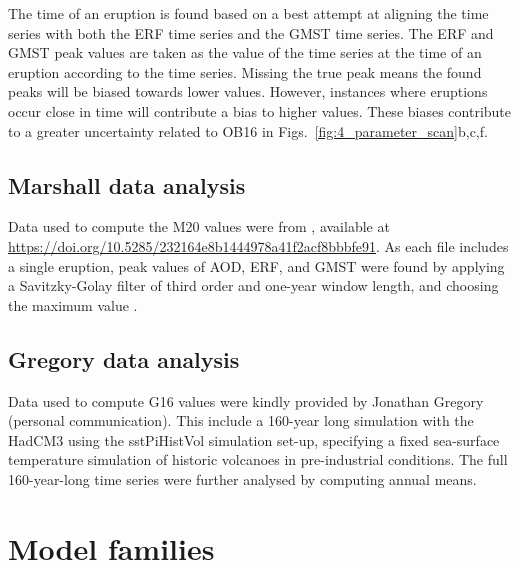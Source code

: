 \documentclass[draft]{agujournal2019}
\begin{document}
  The time of an eruption is found based on a best attempt at aligning the  time
  series with both the ERF time series and the GMST time series. The ERF and GMST peak
  values are taken as the value of the time series at the time of an eruption according
  to the  time series. Missing the true peak means the found peaks will be
  biased towards lower values. However, instances where eruptions occur close in time
  will contribute a bias to higher values. These biases contribute to a greater
  uncertainty related to OB16 in Figs.~\ref{fig:4_parameter_scan}b,c,f.

  \subsection{Marshall data analysis}

  \label{ap:m20}

  Data used to compute the M20 values were from , available
  at \url{https://doi.org/10.5285/232164e8b1444978a41f2acf8bbbfe91}. As each file
  includes a single eruption, peak values of AOD, ERF, and GMST were found by applying a
  Savitzky-Golay filter of third order and one-year window length, and choosing the
  maximum value \cite{savitzky1964}.

  \subsection{Gregory data analysis}

  \label{ap:g16}

  Data used to compute G16 values were kindly provided by Jonathan Gregory (personal
  communication). This include a 160-year long simulation with the HadCM3 using the
  sstPiHistVol simulation set-up, specifying a fixed sea-surface temperature simulation
  of historic volcanoes in pre-industrial conditions. The full 160-year-long time series
  were further analysed by computing annual means.

  \section{Model families}
\end{document}
